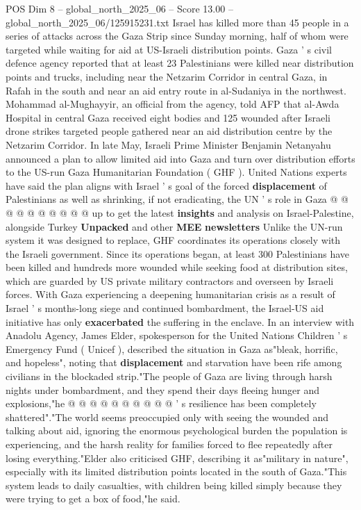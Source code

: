 \begin{textsample}{POS Dim 8 – global\_north\_2025\_06 – Score 13.00 – global\_north\_2025\_06/125915231.txt}  \label{ex:f8_pos_043}
Israel has killed more than 45 people in a series of attacks across the Gaza Strip since Sunday morning, half of whom were targeted while waiting for aid at US-Israeli distribution points.
Gaza ' s civil defence agency reported that at least 23 Palestinians were killed near distribution points and trucks, including near the Netzarim Corridor in central Gaza, in Rafah in the south and near an aid entry route in al-Sudaniya in the northwest.
Mohammad al-Mughayyir, an official from the agency, told AFP that al-Awda Hospital in central Gaza received eight bodies and 125 wounded after Israeli drone strikes targeted people gathered near an aid distribution centre by the Netzarim Corridor.
In late May, Israeli Prime Minister Benjamin Netanyahu announced a plan to allow limited aid into Gaza and turn over distribution efforts to the US-run Gaza Humanitarian Foundation ( GHF ).
United Nations experts have said the plan aligns with Israel ' s goal of the forced \textbf{displacement} of Palestinians as well as shrinking, if not eradicating, the UN ' s role in Gaza @ @ @ @ @ @ @ @ @ @ up to get the latest \textbf{insights} and analysis on Israel-Palestine, alongside Turkey \textbf{Unpacked} and other \textbf{MEE} \textbf{newsletters} Unlike the UN-run system it was designed to replace, GHF coordinates its operations closely with the Israeli government.
Since its operations began, at least 300 Palestinians have been killed and hundreds more wounded while seeking food at distribution sites, which are guarded by US private military contractors and overseen by Israeli forces.
With Gaza experiencing a deepening humanitarian crisis as a result of Israel ' s months-long siege and continued bombardment, the Israel-US aid initiative has only \textbf{exacerbated} the suffering in the enclave.
In an interview with Anadolu Agency, James Elder, spokesperson for the United Nations Children ' s Emergency Fund ( Unicef ), described the situation in Gaza as"bleak, horrific, and hopeless", noting that \textbf{displacement} and starvation have been rife among civilians in the blockaded strip."The people of Gaza are living through harsh nights under bombardment, and they spend their days fleeing hunger and explosions,"he @ @ @ @ @ @ @ @ @ @ ' s resilience has been completely shattered"."The world seems preoccupied only with seeing the wounded and talking about aid, ignoring the enormous psychological burden the population is experiencing, and the harsh reality for families forced to flee repeatedly after losing everything."Elder also criticised GHF, describing it as"military in nature", especially with its limited distribution points located in the south of Gaza."This system leads to daily casualties, with children being killed simply because they were trying to get a box of food,"he said.

\end{textsample}
